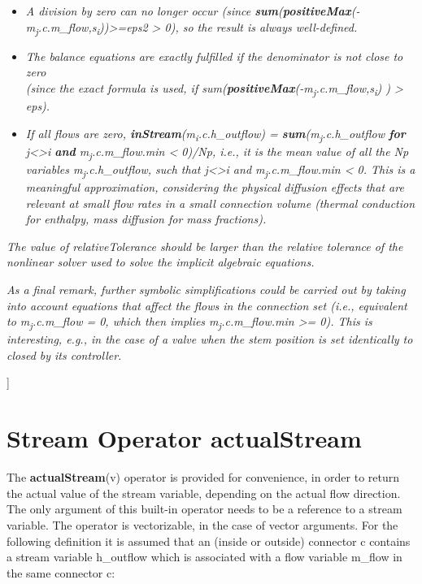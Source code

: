 \documentclass[10pt,a4paper]{report}
\def\doublelabel#1{\label{#1}}
\begin{document}
\begin{itemize}
\item
  \emph{A division by zero can no longer occur (since
  \textbf{sum}(\textbf{positiveMax}(-m\textsubscript{j}.c.m\_flow,s\textsubscript{i}))\textgreater{}=eps2
  \textgreater{} 0), so the result is always well-defined.}
\item
  \emph{The balance equations are exactly fulfilled if the denominator
  is not close to zero\\
  (since the exact formula is used, if
  sum(\textbf{positiveMax}(-m\textsubscript{j}.c.m\_flow,s\textsubscript{i})
  ) \textgreater{} eps).}
\item
  \emph{If all flows are zero,
  \textbf{inStream}(m\textsubscript{i}.c.h}\_\emph{outflow) =
  \textbf{sum}(m\textsubscript{j}.c.h\_outflow \textbf{for}
  j\textless{}\textgreater{}i \textbf{and} m\textsubscript{j}.c.m\_flow.min \textless{}
  0)/Np, i.e., it is the mean value of all the Np variables
  m\textsubscript{j}.c.h}\_\emph{outflow, such that
  j\textless{}\textgreater{}i and
  m\textsubscript{j}.c.m}\_\emph{flow.min \textless{} 0. This is a
  meaningful approximation, considering the physical diffusion effects
  that are relevant at small flow rates in a small connection volume
  (thermal conduction for enthalpy, mass diffusion for mass fractions).}
\end{itemize}

\emph{The value of relativeTolerance should be larger than the relative
tolerance of the nonlinear solver used to solve the implicit algebraic
equations.}

\emph{As a final remark, further symbolic simplifications could be
carried out by taking into account equations that affect the flows in
the connection set (i.e., equivalent to m\textsubscript{j}.c.m\_flow =
0, which then implies m\textsubscript{j}.c.m\_flow.min \textgreater{}=
0). This is interesting, e.g., in the case of a valve when the stem
position is set identically to closed by its controller.}

{]}

\section{Stream Operator actualStream}\doublelabel{stream-operator-actualstream}

The \textbf{actualStream}(v) operator is provided for convenience, in
order to return the actual value of the stream variable, depending on
the actual flow direction. The only argument of this built-in operator
needs to be a reference to a stream variable. The operator is
vectorizable, in the case of vector arguments. For the following
definition it is assumed that an (inside or outside) connector c
contains a stream variable h\_outflow which is associated with a flow
variable m\_flow in the same connector c:
\end{document}
